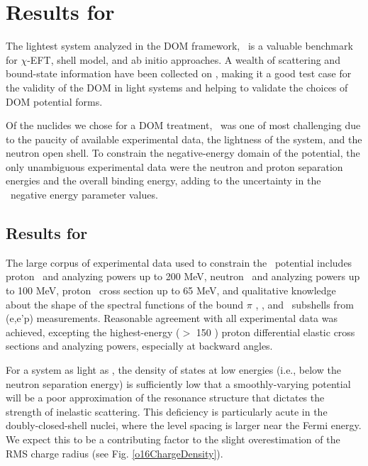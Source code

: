 \section{Results for \oSixEight}
The lightest system analyzed in the DOM framework, \oSix\ is a valuable benchmark
for $\chi$-EFT, shell model, and ab initio approaches. A wealth of scattering and
bound-state information have been collected on \oSix, making it a good test case for the validity
of the DOM in light systems and helping to validate the choices of DOM potential forms.

Of the nuclides we chose for a DOM treatment, \oEight\ was one of most challenging due to the 
paucity of
available experimental data, the lightness of the system, and the neutron open shell.
To constrain the negative-energy domain
of the potential, the only unambiguous experimental data were the neutron and proton separation
energies and the overall binding energy, adding to the uncertainty in the
\oEight\ negative energy parameter values.

\subsection{Results for \oSix}
The large corpus of experimental data used to constrain the \oSix\
potential includes proton \el\ and analyzing powers up to 200 MeV, neutron \el\ and analyzing powers
up to 100 MeV, proton \rxn\ cross section up to 65 MeV, and qualitative knowledge about the shape of
the spectral functions of the bound $\pi$ \sOne, \pThree, and \pOne\ subshells from (e,e'p)
measurements. Reasonable agreement with all 
experimental data was achieved, excepting the highest-energy ($>$ 150 \mega\electronvolt)
proton differential elastic cross sections and analyzing powers, especially at backward angles.

For a system as light as \oSix, the density of states at low energies (i.e., below the neutron
separation energy) is sufficiently low that a smoothly-varying potential will be a poor
approximation of the resonance structure that dictates the strength of inelastic scattering. This
deficiency is particularly acute in the doubly-closed-shell nuclei, where the level spacing is
larger near the Fermi energy. We expect this to be a contributing factor to the slight
overestimation of the RMS charge radius (see Fig. \ref{o16ChargeDensity}).

